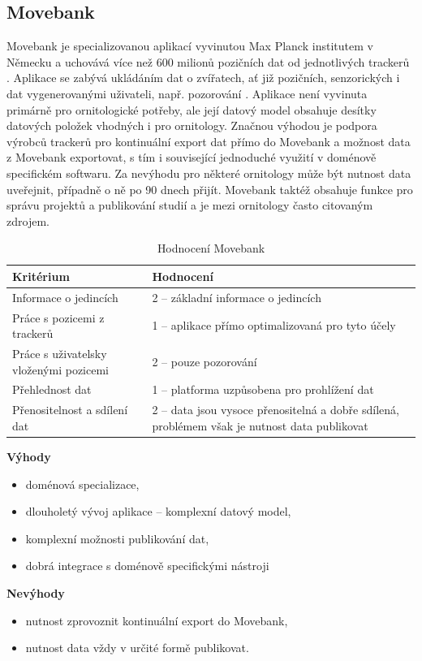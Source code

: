 \subsection{Movebank}

Movebank je specializovanou aplikací vyvinutou Max Planck institutem v Německu a uchovává více než 600 milionů pozičních dat od jednotlivých trackerů  \cite{mrozewski2018movebank}. Aplikace se zabývá ukládáním dat o zvířatech, ať již pozičních, senzorických i dat vygenerovanými uživateli, např. pozorování \cite{kranstauber2011movebank}. Aplikace není vyvinuta primárně pro ornitologické potřeby, ale její datový model obsahuje desítky datových položek vhodných i pro ornitology. Značnou výhodou je podpora výrobců trackerů pro kontinuální export dat přímo do Movebank a možnost data z Movebank exportovat, s tím i související jednoduché využití v doménově specifickém softwaru. Za nevýhodu pro některé ornitology může být nutnost data uveřejnit, případně o ně po 90 dnech přijít. Movebank taktéž obsahuje funkce pro správu projektů a publikování studií a je mezi ornitology často citovaným zdrojem.

\begin{table}[H]
	\begin{tabularx}{\textwidth}{ | X | X | }
		\hline
		Kritérium                              & Hodnocení \\
		\hline			
		Informace o jedincích                  & 2 -- základní informace o jedincích          \\
		\hline
		Práce s pozicemi z trackerů            & 1 -- aplikace přímo optimalizovaná pro tyto účely          \\
		\hline
		Práce s uživatelsky vloženými pozicemi & 2 -- pouze pozorování          \\
		\hline
		Přehlednost dat                        & 1 -- platforma uzpůsobena pro prohlížení dat          \\
		\hline
		Přenositelnost a sdílení dat           & 2 -- data jsou vysoce přenositelná a dobře sdílená, problémem však je nutnost data publikovat          \\
		\hline	
	\end{tabularx}
	\caption{Hodnocení Movebank}
\end{table}

\textbf{Výhody}
\nolisttopbreak
\begin{itemize}
	\item doménová specializace,
	\item dlouholetý vývoj aplikace -- komplexní datový model,
	\item komplexní možnosti publikování dat,
	\item dobrá integrace s doménově specifickými nástroji
\end{itemize}
\textbf{Nevýhody}
\nolisttopbreak
\begin{itemize}
	\item nutnost zprovoznit kontinuální export do Movebank,
	\item nutnost data vždy v určité formě publikovat.
\end{itemize}

